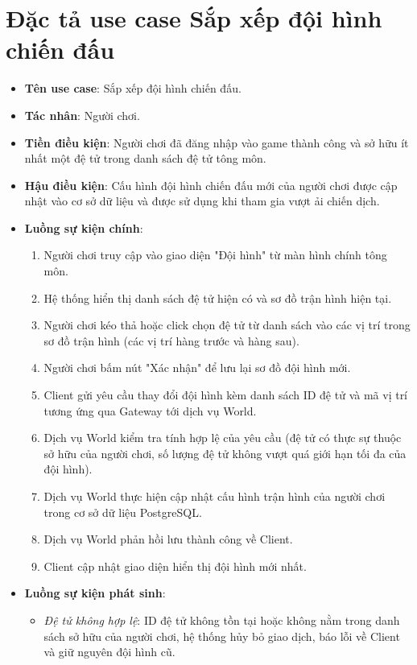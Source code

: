 \documentclass[../Project.tex]{subfiles}
\begin{document}
\section{Đặc tả use case Sắp xếp đội hình chiến đấu}
\label{sec:spec_formation}
\begin{itemize}
    \item \textbf{Tên use case}: Sắp xếp đội hình chiến đấu.
    \item \textbf{Tác nhân}: Người chơi.
    \item \textbf{Tiền điều kiện}: Người chơi đã đăng nhập vào game thành công và sở hữu ít nhất một đệ tử trong danh sách đệ tử tông môn.
    \item \textbf{Hậu điều kiện}: Cấu hình đội hình chiến đấu mới của người chơi được cập nhật vào cơ sở dữ liệu và được sử dụng khi tham gia vượt ải chiến dịch.
    \item \textbf{Luồng sự kiện chính}:
    \begin{enumerate}
        \item Người chơi truy cập vào giao diện "Đội hình" từ màn hình chính tông môn.
        \item Hệ thống hiển thị danh sách đệ tử hiện có và sơ đồ trận hình hiện tại.
        \item Người chơi kéo thả hoặc click chọn đệ tử từ danh sách vào các vị trí trong sơ đồ trận hình (các vị trí hàng trước và hàng sau).
        \item Người chơi bấm nút "Xác nhận" để lưu lại sơ đồ đội hình mới.
        \item Client gửi yêu cầu thay đổi đội hình kèm danh sách ID đệ tử và mã vị trí tương ứng qua Gateway tới dịch vụ World.
        \item Dịch vụ World kiểm tra tính hợp lệ của yêu cầu (đệ tử có thực sự thuộc sở hữu của người chơi, số lượng đệ tử không vượt quá giới hạn tối đa của đội hình).
        \item Dịch vụ World thực hiện cập nhật cấu hình trận hình của người chơi trong cơ sở dữ liệu PostgreSQL.
        \item Dịch vụ World phản hồi lưu thành công về Client.
        \item Client cập nhật giao diện hiển thị đội hình mới nhất.
    \end{enumerate}
    \item \textbf{Luồng sự kiện phát sinh}:
    \begin{itemize}
        \item \textit{Đệ tử không hợp lệ}: ID đệ tử không tồn tại hoặc không nằm trong danh sách sở hữu của người chơi, hệ thống hủy bỏ giao dịch, báo lỗi về Client và giữ nguyên đội hình cũ.
    \end{itemize}
\end{itemize}
\end{document}
